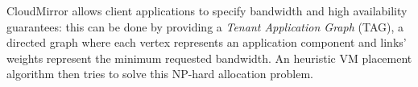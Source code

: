 CloudMirror \cite{cloudmirror} allows client applications to specify bandwidth and high availability guarantees: this can be done by providing a \textit{Tenant Application Graph} (TAG), a directed graph where each vertex represents an application component and links' weights represent the minimum requested bandwidth. An heuristic VM placement algorithm then tries to solve this NP-hard allocation problem.